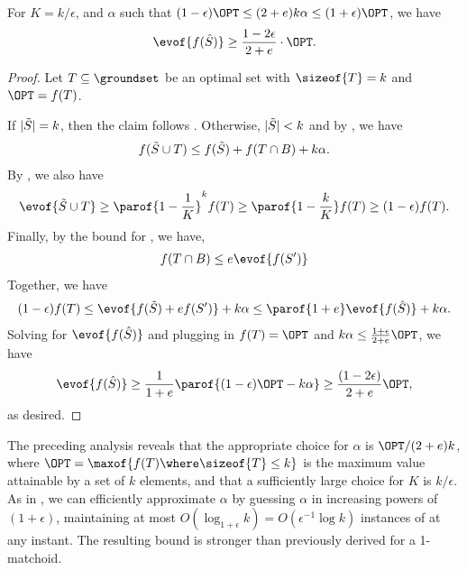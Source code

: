 \documentclass[oneside,letterpaper]{scrartcl} \usepackage{macros}
\begin{document}
\begin{lemma}
  For $K = k/\epsilon$, and $\alpha$ such that $(1-\epsilon) \OPT \leq
  (2+e) k \alpha \leq (1+\epsilon) \OPT$, we have
  \begin{align*}
    \evof{f(\bestset)} \geq \frac{1-2\epsilon}{2 + e} \cdot \OPT.
  \end{align*}
\end{lemma}
\begin{proof}
  Let $T \subseteq \groundset$ be an optimal set with $\sizeof{T} = k$
  and $\OPT = f(T)$.

  If $|\tilde{S}| = k$, then the claim follows
  .  Otherwise, $|\tilde{S}|
  < k$ and by , we have
  \begin{align*}
    f(\tilde{S} \cup T)\leq f(\tilde{S}) + f(T \cap B) + k \alpha.
  \end{align*}
  By , we also have
  \begin{align*}
    \evof{\finalset \cup T} \geq \parof{1-\frac{1}{K}}^k f(T) \geq \parof{1 - \frac{k}{K}} f(T) \geq (1-\epsilon) f(T).
  \end{align*}
  Finally, by the bound for , we have,
  \begin{align*}
    f(T \cap B) \leq e \evof{f(S')}
  \end{align*}
  Together, we have
  \begin{align*}
    (1-\epsilon) f(T) \leq \evof{f(\finalset) + e f(S')} + k \alpha \leq \parof{1 + e} \evof{f(\bestset)} + k \alpha.
  \end{align*}
  Solving for $\evof{f(\bestset)}$ and plugging in $f(T) = \OPT$ and
  $k \alpha \leq \frac{1+\epsilon}{2+e} \OPT$, we have
  \begin{align*}
    \evof{f(\bestset)} \geq \frac{1}{1+e} \parof{(1-\epsilon) \OPT - k \alpha} \geq \frac{(1-2\epsilon)}{2+e} \OPT,
  \end{align*}
  as desired.
\end{proof}

The preceding analysis reveals that the appropriate choice for
$\alpha$ is $\OPT / (2+e)k$, where $\OPT = \maxof{f(T) \where
  \sizeof{T} \leq k}$ is the maximum value attainable by a set of $k$
elements, and that a sufficiently large choice for $K$ is
$k/\epsilon$. As in , we can
efficiently approximate $\alpha$ by guessing $\alpha$ in increasing
powers of $(1+\epsilon)$, maintaining at most $O(\log_{1+\epsilon} k)
= O(\epsilon^{-1} \log k)$ instances of
at any instant. The resulting bound is stronger than previously
derived for a 1-matchoid.
\end{document}
